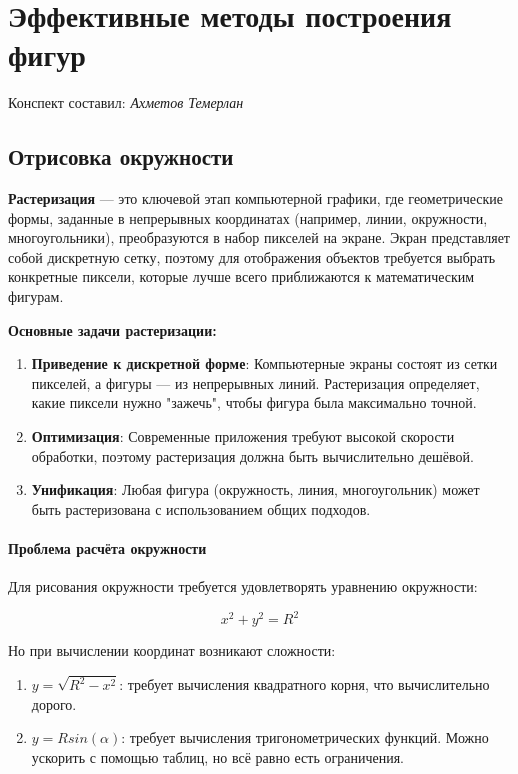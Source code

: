 \section{Эффективные методы построения фигур}
\begin{center}
    Конспект составил: \textit{Ахметов Темерлан}
\end{center}

\subsection{Отрисовка окружности}

\textbf{Растеризация} — это ключевой этап компьютерной графики, где геометрические формы, заданные в непрерывных координатах (например, линии, окружности, многоугольники), преобразуются в набор пикселей на экране. Экран представляет собой дискретную сетку, поэтому для отображения объектов требуется выбрать конкретные пиксели, которые лучше всего приближаются к математическим фигурам.

\textbf{Основные задачи растеризации:}
\begin{enumerate}
    \item \textbf{Приведение к дискретной форме}: Компьютерные экраны состоят из сетки пикселей, а фигуры — из непрерывных линий. Растеризация определяет, какие пиксели нужно "зажечь", чтобы фигура была максимально точной.
    \item \textbf{Оптимизация}: Современные приложения требуют высокой скорости обработки, поэтому растеризация должна быть вычислительно дешёвой.
    \item \textbf{Унификация}: Любая фигура (окружность, линия, многоугольник) может быть растеризована с использованием общих подходов.
\end{enumerate}

\paragraph*{Проблема расчёта окружности}
Для рисования окружности требуется удовлетворять уравнению окружности:

\[
    x^2 + y^2 = R^2
\]

Но при вычислении координат возникают сложности:

\begin{enumerate}
    \item $y = \sqrt{R^2-x^2}$: требует вычисления квадратного корня, что вычислительно дорого.
    \item $y = R sin(\alpha)$: требует вычисления тригонометрических функций. Можно ускорить с помощью таблиц, но всё равно есть ограничения.
\end{enumerate}

